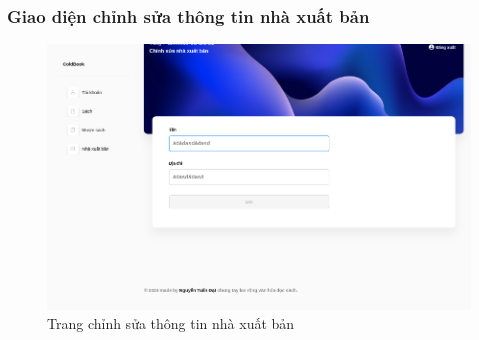 \subsubsection{Giao diện chỉnh sửa thông tin nhà xuất bản}
\begin{figure}[H]
  \centering
   \includegraphics[width=1\textwidth]{report/images/admin/nhaxuatban_detail.png}
  \caption{Trang chỉnh sửa thông tin nhà xuất bản}
\end{figure}
